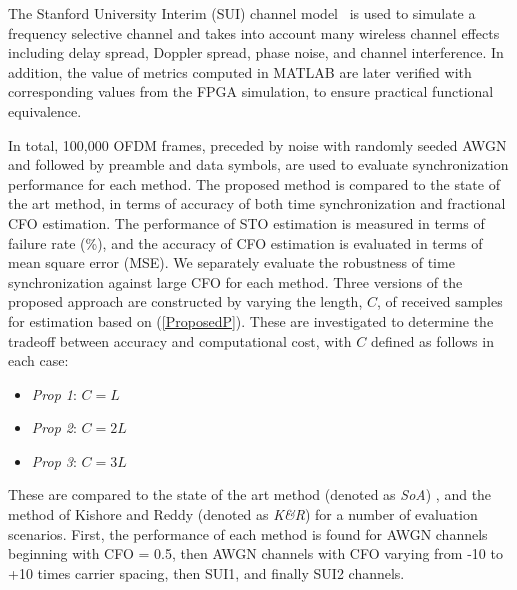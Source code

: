 The Stanford University Interim (SUI) channel model~\cite{V.ErcegJuly2003} is used to simulate a frequency selective channel and takes into account  many wireless channel effects including delay spread, Doppler spread, phase noise, and channel interference.
In addition, the value of metrics computed in MATLAB are later verified with corresponding values from the FPGA simulation, to ensure practical functional equivalence.

In total, 100,000 OFDM frames, preceded by noise with randomly seeded AWGN and followed by preamble and data symbols, are used to evaluate synchronization performance for each method.
The proposed method is compared to the state of the art method, in terms of accuracy of both time synchronization and fractional CFO estimation.
The performance of STO estimation is measured in terms of failure rate (\%), and the accuracy of CFO estimation is evaluated in terms of mean square error (MSE).
We separately evaluate the robustness of time synchronization against large CFO for each method.
Three versions of the proposed approach are constructed by varying the length, $C$, of received samples for estimation based on (\ref{ProposedP}). These are investigated to determine the tradeoff between accuracy and computational cost, with $C$ defined as follows in each case:
\begin{itemize}
\item \textit{Prop 1}: $C=L$
\item \textit{Prop 2}: $C=2L$
\item \textit{Prop 3}: $C=3L$
\end{itemize}
These are compared to the state of the art method (denoted as \textit{SoA}) \cite{Liu2009,Recio2010}, and the method of Kishore and Reddy \cite{Kishore2006} (denoted as \textit{K\&R}) for a number of evaluation scenarios.
First, the performance of each method is found for AWGN channels beginning with CFO = 0.5, then AWGN channels with CFO varying from -10 to +10 times carrier spacing, then SUI1, and finally SUI2 channels.


